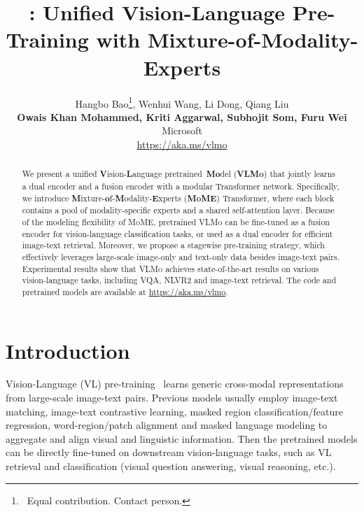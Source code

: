 \documentclass{article}
\title{\our{}: Unified Vision-Language Pre-Training with Mixture-of-Modality-Experts}
\author{{Hangbo Bao\thanks{~Equal contribution.  Contact person.}, Wenhui Wang\footnotemark[1], Li Dong, Qiang Liu} \\ 
\textbf{Owais Khan Mohammed, Kriti Aggarwal, Subhojit Som, Furu Wei} \\
Microsoft \\
\url{https://aka.ms/vlmo}
}
\newcommand\our{\textsc{VLMo}}
\newcommand\mome{\textsc{MoME}}
\begin{document}
\maketitle

\begin{abstract}
We present a unified \textbf{V}ision-\textbf{L}anguage pretrained~\textbf{Mo}del (\textbf{\our{}}) that jointly learns a dual encoder and a fusion encoder with a modular Transformer network. Specifically, we introduce \textbf{M}ixture-\textbf{o}f-\textbf{M}odality-\textbf{E}xperts (\textbf{\mome{}}) Transformer, where each block contains a pool of modality-specific experts and a shared self-attention layer. Because of the modeling flexibility of \mome{}, pretrained \our{} can be fine-tuned as a fusion encoder for vision-language classification tasks, or used as a dual encoder for efficient image-text retrieval. Moreover, we propose a stagewise pre-training strategy, which effectively leverages large-scale image-only and text-only data besides image-text pairs. Experimental results show that \our{} achieves state-of-the-art results on various vision-language tasks, including VQA, NLVR2 and image-text retrieval. The code and pretrained models are available at \url{https://aka.ms/vlmo}.
\end{abstract}



\section{Introduction}
\label{sec:intro}

Vision-Language (VL) pre-training~\cite{vilbert,vl-bert,clip,oscar,vilt,albef} learns generic cross-modal representations from large-scale image-text pairs.
Previous models usually employ image-text matching, image-text contrastive learning, masked region classification/feature regression, word-region/patch alignment and masked language modeling to aggregate and align visual and linguistic information.
Then the pretrained models can be directly fine-tuned on downstream vision-language tasks, such as VL retrieval and classification (visual question answering, visual reasoning, etc.).
\end{document}
